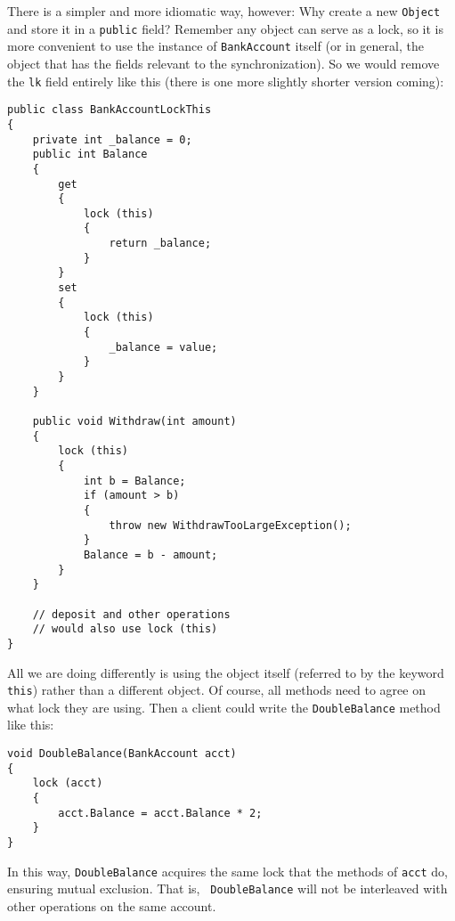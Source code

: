 \documentclass[10pt]{article}
\begin{document}
There is a simpler and more idiomatic way, however: Why create a new
{\tt Object} and store it in a {\tt public} field?  Remember any
object can serve as a lock, so it is more convenient 
to use the instance of {\tt BankAccount} itself (or in
general, the object that has the fields relevant to the
synchronization).  So we would remove the {\tt lk} field entirely like
this (there is one more slightly shorter version coming):
\begin{verbatim}
public class BankAccountLockThis
{
    private int _balance = 0;
    public int Balance
    {
        get
        {
            lock (this)
            {
                return _balance;
            }
        }
        set
        {
            lock (this)
            {
                _balance = value;
            }
        }
    }

    public void Withdraw(int amount)
    {
        lock (this)
        {
            int b = Balance;
            if (amount > b)
            {
                throw new WithdrawTooLargeException();
            }
            Balance = b - amount;
        }
    }

    // deposit and other operations
    // would also use lock (this)
}
\end{verbatim}
All we are doing differently is using the object itself (referred to
by the keyword {\tt this}) rather than a different object.  Of course,
all methods need to agree on what lock they are using.  Then a client
could write the {\tt DoubleBalance} method like this:
\begin{verbatim}
void DoubleBalance(BankAccount acct)
{
    lock (acct)
    {
        acct.Balance = acct.Balance * 2;
    }
}
\end{verbatim}
In this way, {\tt DoubleBalance} acquires the same lock that the
methods of {\tt acct} do, ensuring mutual exclusion.  That is, {\tt
  DoubleBalance} will not be interleaved with other operations on the
same account.
\end{document}
